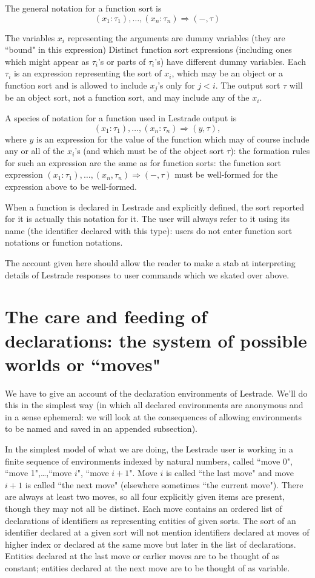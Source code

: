 \documentclass[12pt]{article}
\begin{document}
The general notation for a function sort is $$(x_1:\tau_1),\ldots,(x_n:\tau_n) \Rightarrow (-,\tau)$$

The variables $x_i$ representing the arguments are dummy variables (they are ``bound" in this expression)  Distinct function sort expressions (including ones which might appear as $\tau_i$'s or parts of $\tau_i$'s) have different dummy variables.  Each $\tau_i$ is an expression representing the sort of $x_i$, which may be an object or a function sort and  is allowed to include $x_j$'s only for $j<i$.  The output sort $\tau$ will be an object sort, not a function sort, and may include any of the $x_i$.

A species of notation for a function used in Lestrade output is $$(x_1:\tau_1),\ldots,(x_n:\tau_n) \Rightarrow (y,\tau),$$ where $y$ is an expression for the value of the function which may of course include any or all of the $x_i$'s (and which must be of the object sort $\tau$):  the formation rules for such an expression are the same as for function sorts:  the function sort expression $(x_1:\tau_1),\ldots,(x_n,\tau_n) \Rightarrow (-,\tau)$  must be well-formed for the expression above to be well-formed.

When a function is declared in Lestrade and explicitly defined, the sort reported for it is actually this notation for it.  The user will always refer to it using its name (the identifier declared with this type):  users do not enter function sort notations or function notations.

The account given here should allow the reader to make a stab at interpreting details of Lestrade responses to user commands which we skated over above.

\section{The care and feeding of declarations:  the system of possible worlds or ``moves"}

We have to give an account of the declaration environments of Lestrade.  We'll do this in the simplest way (in which all declared environments are anonymous and in a sense ephemeral:  we will look at the consequences of allowing environments to be named and saved in an appended subsection).

In the simplest model of what we are doing, the Lestrade user is working in a finite sequence of environments indexed by natural numbers, called
``move 0", ``move 1",\ldots,``move $i$", ``move $i+1$".   Move $i$ is called ``the last move" and move $i+1$ is called ``the next move" (elsewhere sometimes ``the current move").  There are always at least two moves, so all four explicitly given items are present, though they may not all be distinct.  Each move contains an ordered list of declarations of identifiers as representing entities of given sorts.  The sort of an identifier declared at a given sort will not mention identifiers declared at moves of higher index or declared at the same move but later in the list of declarations.  Entities declared at the last move or earlier moves are to be thought of as constant;
entities declared at the next move are to be thought of as variable.
\end{document}
